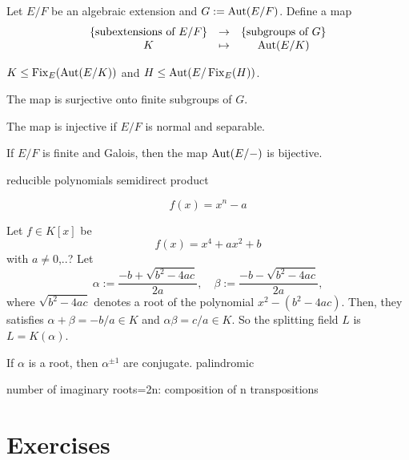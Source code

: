 \documentclass{../../large}
\begin{document}
\begin{prb}
Let $E/F$ be an algebraic extension and $G:=\operatorname{Aut}(E/F)$.
Define a map
\[\begin{array}{ccc}
\{\text{subextensions of $E/F$}\}
&\to&
\{\text{subgroups of $G$}\}\\
K&\mapsto&\operatorname{Aut}(E/K)
\end{array}\]


\begin{parts}
\item $K\le \operatorname{Fix}_E(\operatorname{Aut}(E/K))$ and $H\le\operatorname{Aut}(E/\operatorname{Fix}_E(H))$.
\item The map is surjective onto finite subgroups of $G$.
\item The map is injective if $E/F$ is normal and separable.
\item If $E/F$ is finite and Galois, then the map $\operatorname{Aut}(E/-)$ is bijective.
\end{parts}
\end{prb}




reducible polynomials
semidirect product


\begin{prb}
\[f(x)=x^n-a\]
\end{prb}

\begin{prb}
Let $f\in K[x]$ be
\[f(x)=x^4+ax^2+b\]
with $a\ne0$,..?
Let
\[\alpha:=\frac{-b+\sqrt{b^2-4ac}}{2a},\quad\beta:=\frac{-b-\sqrt{b^2-4ac}}{2a},\]
where $\sqrt{b^2-4ac}$ denotes a root of the polynomial $x^2-(b^2-4ac)$.
Then, they satisfies $\alpha+\beta=-b/a\in K$ and $\alpha\beta=c/a\in K$.
So the splitting field $L$ is $L=K(\alpha)$.
\end{prb}

\begin{prb}
If $\alpha$ is a root, then $\alpha^{\pm1}$ are conjugate.
palindromic
\end{prb}

\begin{prb}
number of imaginary roots=2n: composition of n transpositions
\end{prb}



\section*{Exercises}
\end{document}
